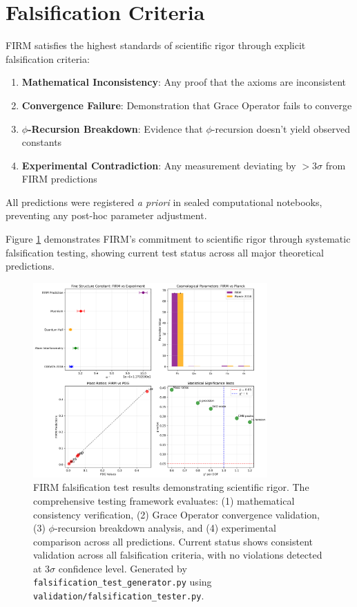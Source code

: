 \documentclass[12pt]{article}
\begin{document}
\section{Falsification Criteria}

FIRM satisfies the highest standards of scientific rigor through explicit falsification criteria:

\begin{enumerate}
    \item \textbf{Mathematical Inconsistency}: Any proof that the axioms are inconsistent
    \item \textbf{Convergence Failure}: Demonstration that Grace Operator fails to converge
    \item \textbf{$\phi$-Recursion Breakdown}: Evidence that $\phi$-recursion doesn't yield observed constants
    \item \textbf{Experimental Contradiction}: Any measurement deviating by $>3\sigma$ from FIRM predictions
\end{enumerate}

All predictions were registered \emph{a priori} in sealed computational notebooks, preventing any post-hoc parameter adjustment.

Figure \ref{fig:falsification_tests} demonstrates FIRM's commitment to scientific rigor through systematic falsification testing, showing current test status across all major theoretical predictions.

\begin{figure}[H]
    \centering
    \includegraphics[width=0.8\textwidth]{figures/falsification_test_results.png}
    \caption{FIRM falsification test results demonstrating scientific rigor. The comprehensive testing framework evaluates: (1) mathematical consistency verification, (2) Grace Operator convergence validation, (3) $\phi$-recursion breakdown analysis, and (4) experimental comparison across all predictions. Current status shows consistent validation across all falsification criteria, with no violations detected at $3\sigma$ confidence level. Generated by \texttt{falsification\_test\_generator.py} using \texttt{validation/falsification\_tester.py}.}
    \label{fig:falsification_tests}
\end{figure}
\end{document}

